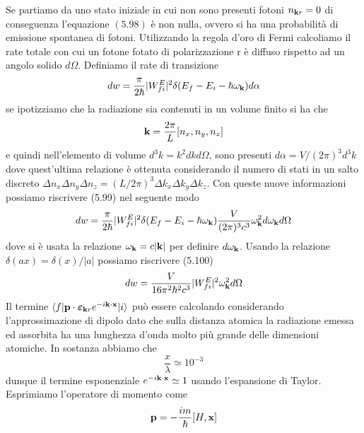 Se partiamo da uno stato iniziale in cui non sono presenti fotoni $n_{\bold{k}r} = 0$ di conseguenza l'equazione $(5.98)$ \`e non nulla, ovvero si ha una probabilit\`a di emissione spontanea di fotoni. Utilizzando la regola d'oro di Fermi calcoliamo il rate totale con cui un fotone fotato di polarizzazione r \`e diffuso rispetto ad un angolo solido $d \Omega$. Definiamo il rate di transizione
\begin{equation}
	dw = \frac{\pi}{2\hbar}|W_{fi}^{E}|^2 \delta(E_f-E_i-\hbar \omega_{\bold{k}})d\alpha 
\end{equation}
se ipotizziamo che la radiazione sia contenuti in un volume finito si ha che 
\begin{equation*}
	\bold{k} = \frac{2 \pi}{L}[n_x,n_y,n_z]
\end{equation*}
e quindi nell'elemento di volume $d^3 k = k^2 dk d\Omega$, sono presenti $d \alpha = V/(2\pi)^3d^3k$ dove quest'ultima relazione \`e ottenuta considerando il numero di stati in un salto discreto $\Delta n_x \Delta n_y \Delta n_z = (L/2\pi)^3 \Delta k_x \Delta k_y \Delta k_z$. Con queste nuove informazioni possiamo riscrivere (5.99) nel seguente modo
\newpage
\begin{equation}
	dw = \frac{\pi}{2\hbar}|W_{fi}^E|^2 \delta(E_f-E_i-\hbar \omega_{\bold{k}})\frac{V}{(2\pi)^3c^3}\omega_{\bold{k}}^2 d\omega_{\bold{k}}d\Omega
\end{equation}
dove si \`e usata la relazione $\omega_{\bold{k}} = c|\bold{k}|$ per definire $d\omega_{\bold{k}}$.  Usando la relazione $\delta(ax) = \delta(x)/|a|$  possiamo riscrivere (5.100) 
\begin{equation*}
	dw= \frac{V}{16 \pi^2 \hbar^2c^3}|W_{fi}^E|^2 \omega_{\bold{k}}^2d \Omega 
\end{equation*}
Il termine $\langle f | \bold{p} \cdot \boldsymbol{\varepsilon}_{\bold{k}r}e^{-i \bold{k} \cdot \bold{x}}|i \rangle$ pu\`o essere calcolando considerando l'approssimazione di dipolo dato che sulla distanza atomica la radiazione emessa ed assorbita  ha una lunghezza d'onda molto pi\`u grande delle dimensioni atomiche. In sostanza abbiamo che 
\begin{equation*}
	\frac{x}{\lambda} \simeq 10^{-3}
\end{equation*}
dunque il termine esponenziale $e^{-i \bold{k}\cdot \bold{x}} \simeq 1$ usando l'espansione di Taylor. Esprimiamo l'operatore di momento come 
\begin{equation*}
	\bold{p} = -\frac{im}{\hbar}[H,\bold{x}]
\end{equation*}
